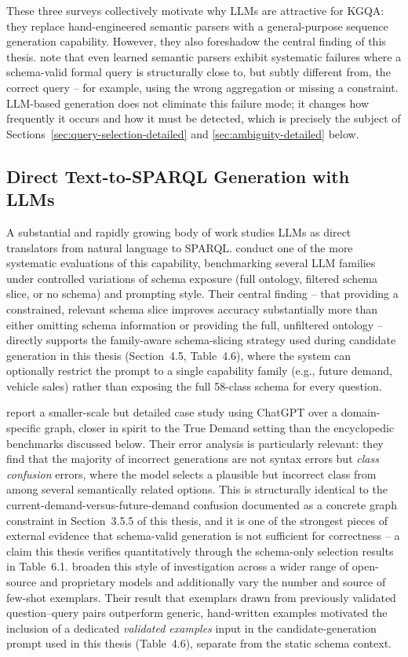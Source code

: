 \documentclass[
  12pt,
  english,
  oneside]{report}
\begin{document}
These three surveys collectively motivate why LLMs are attractive for KGQA:
they replace hand-engineered semantic parsers with a general-purpose
sequence generation capability. However, they also foreshadow the central
finding of this thesis. \citet{lan2021survey} note that even
learned semantic parsers exhibit systematic failures where a schema-valid
formal query is structurally close to, but subtly different from, the
correct query -- for example, using the wrong aggregation or missing a
constraint. LLM-based generation does not eliminate this failure mode; it
changes how frequently it occurs and how it must be detected, which is
precisely the subject of Sections~\ref{sec:query-selection-detailed} and
\ref{sec:ambiguity-detailed} below.

\subsection{Direct Text-to-SPARQL Generation with LLMs}

A substantial and rapidly growing body of work studies LLMs as direct
translators from natural language to SPARQL. \citet{meyer2024assessing}
conduct one of the more systematic evaluations of this capability,
benchmarking several LLM families under controlled variations of schema
exposure (full ontology, filtered schema slice, or no schema) and prompting
style. Their central finding -- that providing a constrained, relevant
schema slice improves accuracy substantially more than either omitting
schema information or providing the full, unfiltered ontology -- directly
supports the family-aware schema-slicing strategy used during candidate
generation in this thesis (Section~4.5, Table~4.6), where the system can
optionally restrict the prompt to a single capability family (e.g.,
future demand, vehicle sales) rather than exposing the full 58-class
schema for every question.

\citet{avila2024experiments} report a smaller-scale but detailed case
study using ChatGPT over a domain-specific graph, closer in spirit to the
True Demand setting than the encyclopedic benchmarks discussed below. Their
error analysis is particularly relevant: they find that the majority of
incorrect generations are not syntax errors but \emph{class confusion}
errors, where the model selects a plausible but incorrect class from among
several semantically related options. This is structurally identical to
the current-demand-versus-future-demand confusion documented as a concrete
graph constraint in Section~3.5.5 of this thesis, and it is one of the
strongest pieces of external evidence that schema-valid generation is not
sufficient for correctness -- a claim this thesis verifies quantitatively
through the schema-only selection results in Table~6.1.
\citet{dabramo2025investigating} broaden this style of investigation across
a wider range of open-source and proprietary models and additionally vary
the number and source of few-shot exemplars. Their result that exemplars
drawn from previously validated question--query pairs outperform generic,
hand-written examples motivated the inclusion of a dedicated
\emph{validated examples} input in the candidate-generation prompt used in
this thesis (Table~4.6), separate from the static schema context.
\end{document}
